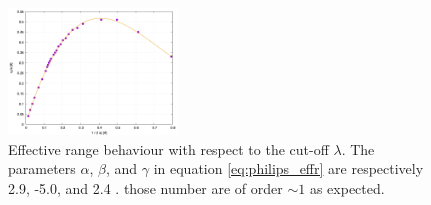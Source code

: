 \documentclass[aps,nofootinbib,prl,showpacs,twocolumn,groupedaddress,superscriptaddress]
{revtex4}
\begin{document}
\begin{figure}[htb] 
\begin{center} 
\includegraphics[width=0.4\textwidth]{Graf/effective_range.png}
\caption{Effective range behaviour with respect to the cut-off $\lambda$. The parameters $\alpha$, $\beta$, and $\gamma$ in equation \ref{eq:philips_effr} are respectively 2.9, -5.0, and 2.4 . those number are of order $\sim 1$ as expected.}
\label{fig:fig1}
\end{center} 
\end{figure}
\end{document}

